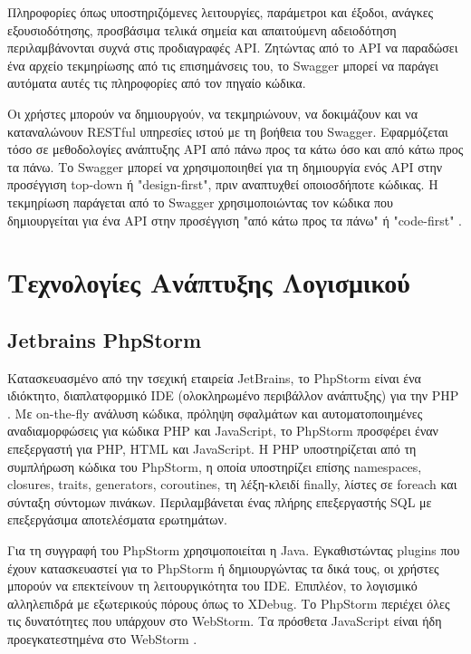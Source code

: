 Πληροφορίες όπως υποστηριζόμενες λειτουργίες, παράμετροι και έξοδοι, ανάγκες εξουσιοδότησης, προσβάσιμα τελικά σημεία και απαιτούμενη αδειοδότηση περιλαμβάνονται συχνά στις προδιαγραφές API. Ζητώντας από το API να παραδώσει ένα αρχείο τεκμηρίωσης από τις επισημάνσεις του, το Swagger μπορεί να παράγει αυτόματα αυτές τις πληροφορίες από τον πηγαίο κώδικα.

Οι χρήστες μπορούν να δημιουργούν, να τεκμηριώνουν, να δοκιμάζουν και να καταναλώνουν RESTful υπηρεσίες ιστού με τη βοήθεια του Swagger. Εφαρμόζεται τόσο σε μεθοδολογίες ανάπτυξης API από πάνω προς τα κάτω όσο και από κάτω προς τα πάνω. Το Swagger μπορεί να χρησιμοποιηθεί για τη δημιουργία ενός API στην προσέγγιση top-down ή "design-first", πριν αναπτυχθεί οποιοσδήποτε κώδικας. Η τεκμηρίωση παράγεται από το Swagger χρησιμοποιώντας τον κώδικα που δημιουργείται για ένα API στην προσέγγιση "από κάτω προς τα πάνω" ή "code-first" \cite{Swagger_2019}.

\section{Τεχνολογίες Ανάπτυξης Λογισμικού}

\subsection{Jetbrains PhpStorm}
Κατασκευασμένο από την τσεχική εταιρεία JetBrains, το PhpStorm είναι ένα ιδιόκτητο, διαπλατφορμικό IDE (ολοκληρωμένο περιβάλλον ανάπτυξης) για την PHP \cite{grigorev2014string}. Με on-the-fly ανάλυση κώδικα, πρόληψη σφαλμάτων και αυτοματοποιημένες αναδιαμορφώσεις για κώδικα PHP και JavaScript, το PhpStorm προσφέρει έναν επεξεργαστή για PHP, HTML και JavaScript. Η PHP υποστηρίζεται από τη συμπλήρωση κώδικα του PhpStorm, η οποία υποστηρίζει επίσης namespaces, closures, traits, generators, coroutines, τη λέξη-κλειδί finally, λίστες σε foreach και σύνταξη σύντομων πινάκων. Περιλαμβάνεται ένας πλήρης επεξεργαστής SQL με επεξεργάσιμα αποτελέσματα ερωτημάτων.

Για τη συγγραφή του PhpStorm χρησιμοποιείται η Java. Εγκαθιστώντας plugins που έχουν κατασκευαστεί για το PhpStorm ή δημιουργώντας τα δικά τους, οι χρήστες μπορούν να επεκτείνουν τη λειτουργικότητα του IDE. Επιπλέον, το λογισμικό αλληλεπιδρά με εξωτερικούς πόρους όπως το XDebug. Το PhpStorm περιέχει όλες τις δυνατότητες που υπάρχουν στο WebStorm. Τα πρόσθετα JavaScript είναι ήδη προεγκατεστημένα στο WebStorm \cite{PhpStorm_JetBrains}.

